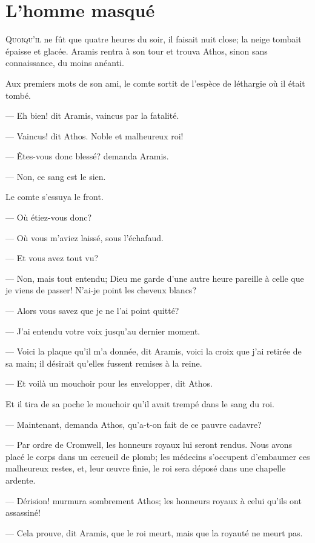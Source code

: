 \chapter{L'homme masqué}

\lettrine{Q}{uoiqu'il} ne fût que quatre heures du soir, il faisait nuit close; la neige tombait épaisse et glacée. Aramis rentra à son tour et trouva Athos, sinon sans connaissance, du moins anéanti.

\zz
Aux premiers mots de son ami, le comte sortit de l'espèce de léthargie où il était tombé.

— Eh bien! dit Aramis, vaincus par la fatalité.

— Vaincus! dit Athos. Noble et malheureux roi!

— Êtes-vous donc blessé? demanda Aramis.

— Non, ce sang est le sien.

Le comte s'essuya le front.

— Où étiez-vous donc?

— Où vous m'aviez laissé, sous l'échafaud.

— Et vous avez tout vu?

— Non, mais tout entendu; Dieu me garde d'une autre heure pareille à celle que je viens de passer! N'ai-je point les cheveux blancs?

— Alors vous savez que je ne l'ai point quitté?

— J'ai entendu votre voix jusqu'au dernier moment.

— Voici la plaque qu'il m'a donnée, dit Aramis, voici la croix que j'ai retirée de sa main; il désirait qu'elles fussent remises à la reine.

— Et voilà un mouchoir pour les envelopper, dit Athos.

Et il tira de sa poche le mouchoir qu'il avait trempé dans le sang du roi.

— Maintenant, demanda Athos, qu'a-t-on fait de ce pauvre cadavre?

— Par ordre de Cromwell, les honneurs royaux lui seront rendus. Nous avons placé le corps dans un cercueil de plomb; les médecins s'occupent d'embaumer ces malheureux restes, et, leur œuvre finie, le roi sera déposé dans une chapelle ardente.

— Dérision! murmura sombrement Athos; les honneurs royaux à celui qu'ils ont assassiné!

— Cela prouve, dit Aramis, que le roi meurt, mais que la royauté ne meurt pas.

